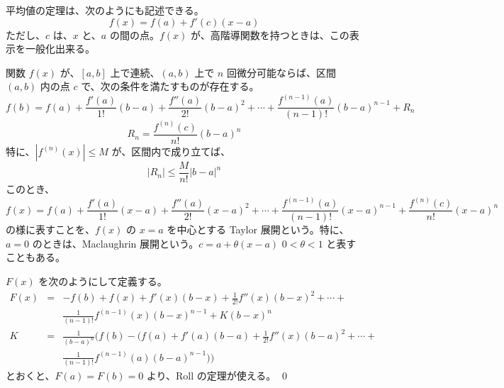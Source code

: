 平均値の定理は、次のようにも記述できる。
$$f(x) = f(a) + f'(c)(x-a)$$
ただし、$c$ は、$x$ と、$a$ の間の点。$f(x)$  が、高階導関数を持つときは、この表示を一般化出来る。

\begin{prop}
関数 $f(x)$ が、$[a,b]$ 上で連続、$(a,b)$ 上で $n$ 回微分可能ならば、区間
$(a,b)$ 内の点 $c$ で、次の条件を満たすものが存在する。
$$f(b) = f(a) + \frac{f'(a)}{1!}(b-a) + \frac{f''(a)}{2!}(b-a)^2 + \cdots + \frac{f^{(n-1)}(a)}{(n-1)!}(b-a)^{n-1} + R_n$$
$$R_n = \frac{f^{(n)}(c)}{n!}(b-a)^n$$
特に、$|f^{(n)}(x)|\leq M$ が、区間内で成り立てば、
$$|R_n| \leq \frac{M}{n!}|b-a|^n$$
このとき、
$$f(x) = f(a) + \frac{f'(a)}{1!}(x-a) + \frac{f''(a)}{2!}(x-a)^2 + \cdots + \frac{f^{(n-1)}(a)}{(n-1)!}(x-a)^{n-1} + \frac{f^{(n)}(c)}{n!}(x-a)^n$$
の様に表すことを、$f(x)$ の $x = a$ を中心とする Taylor 展開という。特に、$a = 0$ のときは、Maclaughrin 展開という。$c = a + \theta(x-a)$ $0<\theta < 1$ と表すこともある。
\end{prop}
\proof
$F(x)$ を次のようにして定義する。
\begin{eqnarray*}
F(x) & =  & -f(b) + f(x) + f'(x)(b-x) + \frac{1}{2!}f''(x)(b-x)^2 + \cdots + \\
  & & \frac{1}{(n-1)!}f^{(n-1)}(x)(b-x)^{n-1} + K(b-x)^n\\
K & = &  \frac{1}{(b-a)^n}\bigl(f(b) - \bigl(f(a) + f'(a)(b-a) + \frac{1}{2!}f''(x)(b-a)^2 + \cdots +\\
& & \frac{1}{(n-1)!}f^{(n-1)}(a)(b-a)^{n-1}\bigr)\bigr)
\end{eqnarray*}
とおくと、$F(a) = F(b) = 0$ より、Roll の定理が使える。
\qed

